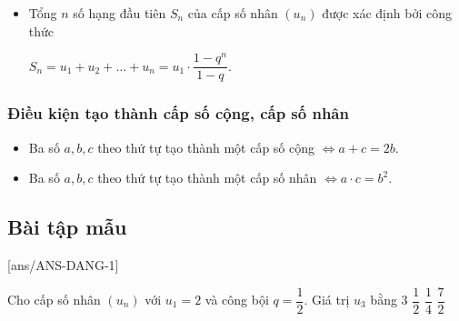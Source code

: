 \begin{khung}
\begin{itemize}
\begin{center}
		\end{center}
		\item Tổng $n$ số hạng đầu tiên $S_n$ của cấp số nhân $\left(u_n \right)$ được xác định bởi công thức 
		\begin{center}
			\begin{tcolorbox}
			\begin{center}
				$S_n=u_1+u_2+\ldots+u_n=u_1\cdot\dfrac{1-q^n}{1-q}.$
			\end{center}
		\end{tcolorbox}
		\end{center}
	\end{itemize}
\end{khung}
\begin{khung}
	\subsubsection{Điều kiện tạo thành cấp số cộng, cấp số nhân}
	\begin{itemize}
		\item Ba số $a, b, c$ theo thứ tự tạo thành một cấp số cộng $\Leftrightarrow a+c=2b$.
		\item Ba số $a, b, c$ theo thứ tự tạo thành một cấp số nhân $\Leftrightarrow a\cdot c=b^2$.
	\end{itemize}
\end{khung}
\subsection{Bài tập mẫu}
[ans/ANS-DANG-1]
\begin{khung}
	\begin{vd}%
		Cho cấp số nhân $\left(u_n\right)$ với $u_1=2$ và công bội $q=\dfrac{1}{2}$. Giá trị $u_3$ bằng
		\choice
		{$3$}	
		{\True $\dfrac{1}{2}$}
		{$\dfrac{1}{4}$}
		{$\dfrac{7}{2}$}
	\end{vd}
\end{khung}
